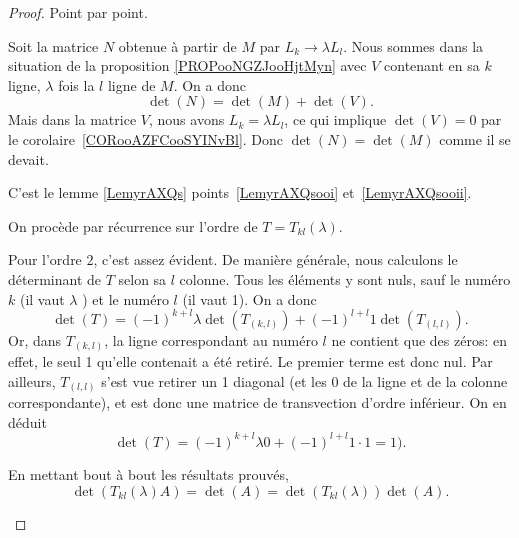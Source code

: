 \begin{proof}
    Point par point.
    \begin{subproof}
    \item[\ref{ITEMooJSRDooTggEyO}]
        Soit la matrice \( N\) obtenue à partir de \( M\) par \( L_k\to \lambda L_l\). Nous sommes dans la situation de la proposition \ref{PROPooNGZJooHjtMyn} avec \( V \) contenant en sa \( k\)\ieme{} ligne, \(\lambda \) fois la \( l\)\ieme{} ligne de \( M \). On a donc
        \begin{equation}
            \det(N)=\det(M)+\det(V).
        \end{equation}
        Mais dans la matrice \( V\), nous avons \( L_k=\lambda L_l\), ce qui implique \( \det(V)=0\) par le corolaire~\ref{CORooAZFCooSYINvBl}. Donc \( \det(N)=\det(M)\) comme il se devait.
    \item[\ref{ITEMooHKZWooVZDgnf}]
     C'est le lemme \ref{LemyrAXQs} points~\ref{LemyrAXQsooi} et~\ref{LemyrAXQsooii}.

    \item[\ref{ITEMooPGYJooWTTghT}]
        On procède par récurrence sur l'ordre de \( T = T_{kl}(\lambda)\).
        
        Pour l'ordre \( 2 \), c'est assez évident. De manière générale, nous calculons le déterminant de \( T \) selon sa \( l\)\ieme{} colonne. Tous les éléments y sont nuls, sauf le numéro \( k \) (il vaut \( \lambda \) ) et le numéro \( l \) (il vaut 1). On a donc
    \begin{equation}
      \det(T) = (-1)^{k+l} \lambda \det(T_{(k,l)}) + (-1)^{l+l} 1 \det(T_{(l,l)}).
    \end{equation}
    Or, dans \(T_{(k,l)}\), la ligne correspondant au numéro \( l \) ne contient que des zéros: en effet, le seul 1 qu'elle contenait a été retiré. Le premier terme est donc nul. Par ailleurs, \(T_{(l,l)}\) s'est vue retirer un 1 diagonal (et les 0 de la ligne et de la colonne correspondante), et est donc une matrice de transvection d'ordre inférieur. On en déduit
       \begin{equation}
      \det(T) = (-1)^{k+l} \lambda 0 + (-1)^{l+l} 1\cdot 1 = 1).
    \end{equation}         
        \item[\ref{ITEMooBBEAooZJVGNV}]
            En mettant bout à bout les résultats prouvés,
            \begin{equation}
                \det(T_{kl}(\lambda)A)=\det(A)=\det(T_{kl}(\lambda))\det(A).
            \end{equation}
    \end{subproof}
    

\end{proof}
